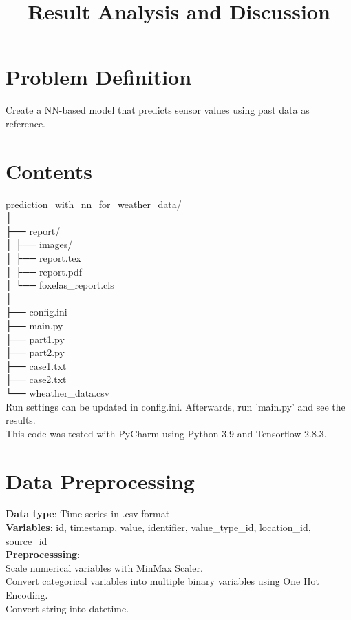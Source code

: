 \documentclass{foxelas_report}
\title{Result Analysis and Discussion}
\author{}
\date{}
\begin{document}
\maketitle



\section{Problem Definition}
Create a NN-based model that predicts sensor values using past data as reference. 

\section{Contents}
prediction\_with\_nn\_for\_weather\_data/\\
│\\
├── report/\\
│     ├── images/\\
│     ├── report.tex\\
│     ├── report.pdf\\
│     └── foxelas\_report.cls\\
│   \\
├── config.ini\\
├── main.py\\
├── part1.py\\
├── part2.py\\
├── case1.txt\\
├── case2.txt\\
└── wheather\_data.csv\\

Run settings can be updated in config.ini. Afterwards, run 'main.py' and see the results. \\
This code was tested with PyCharm using Python 3.9 and Tensorflow 2.8.3.


\section{Data Preprocessing}
\textbf{Data type}: Time series in .csv format\\
\textbf{Variables}: id, timestamp, value, identifier, value\_type\_id, location\_id, source\_id\\

\textbf{Preprocesssing}: \\
Scale numerical variables with MinMax Scaler.\\
Convert categorical variables into multiple binary variables using One Hot Encoding.\\
Convert string into datetime. \\
\end{document}
